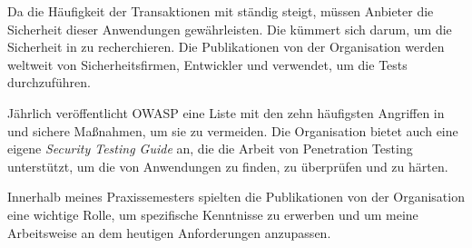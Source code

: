 Da die Häufigkeit der Transaktionen mit  ständig steigt, müssen Anbieter die Sicherheit dieser Anwendungen gewährleisten. Die  kümmert sich darum, um die Sicherheit in  zu recherchieren. Die Publikationen von der Organisation werden weltweit von Sicherheitsfirmen, Entwickler und  verwendet, um die Tests durchzuführen. 

Jährlich veröffentlicht \gls{OWASP} eine Liste mit den zehn häufigsten Angriffen in  und sichere Maßnahmen, um sie zu vermeiden. Die Organisation bietet auch eine eigene \textit{Security Testing Guide} an, die die Arbeit von Penetration Testing unterstützt, um die  von Anwendungen zu finden, zu überprüfen und zu härten.

Innerhalb meines Praxissemesters spielten die Publikationen von der Organisation eine wichtige Rolle, um spezifische Kenntnisse zu erwerben und um meine Arbeitsweise an dem heutigen Anforderungen anzupassen. 